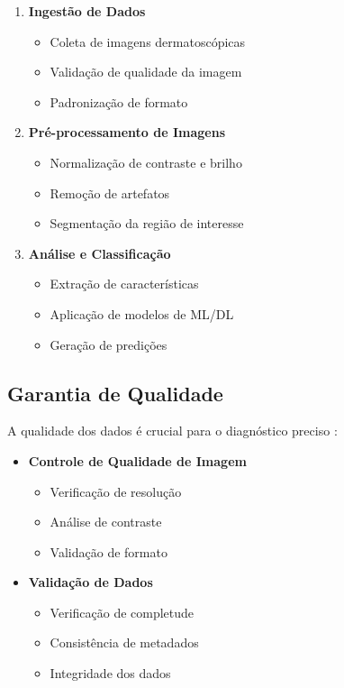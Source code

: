 \begin{enumerate}
\item \textbf{Ingestão de Dados}
\begin{itemize}
\item Coleta de imagens dermatoscópicas
\item Validação de qualidade da imagem
\item Padronização de formato
\end{itemize}
\item \textbf{Pré-processamento de Imagens}
\begin{itemize}
    \item Normalização de contraste e brilho
    \item Remoção de artefatos
    \item Segmentação da região de interesse
\end{itemize}

\item \textbf{Análise e Classificação}
\begin{itemize}
    \item Extração de características
    \item Aplicação de modelos de ML/DL
    \item Geração de predições
\end{itemize}
\end{enumerate}

\subsection{Garantia de Qualidade}

A qualidade dos dados é crucial para o diagnóstico preciso \cite{smith2023quality}:

\begin{itemize}
\item \textbf{Controle de Qualidade de Imagem}
\begin{itemize}
\item Verificação de resolução
\item Análise de contraste
\item Validação de formato
\end{itemize}

\item \textbf{Validação de Dados}
\begin{itemize}
    \item Verificação de completude
    \item Consistência de metadados
    \item Integridade dos dados
\end{itemize}
\end{itemize}

